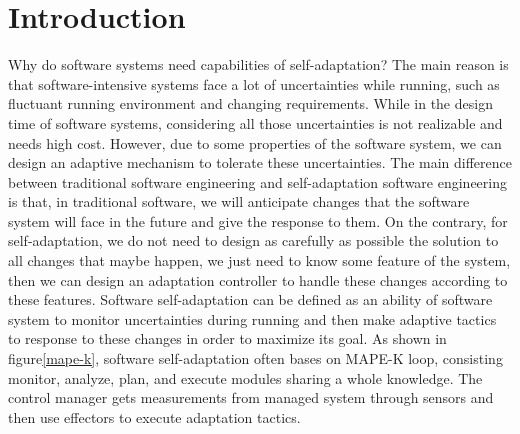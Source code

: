 \documentclass[sigconf]{acmart}
\begin{document}


\maketitle

\section{Introduction}
Why do software systems need  capabilities of self-adaptation?
The main reason is that software-intensive systems face a lot of uncertainties while running, such as fluctuant running environment and changing requirements. While in the design time of software systems, considering all those uncertainties is not realizable and needs high cost. However, due to some properties of the software system, we can design an adaptive mechanism to tolerate these uncertainties. The main difference between traditional software engineering and self-adaptation software engineering is that, in traditional software, we will anticipate changes that the software system will face in the future and give the response to them. On the contrary, for self-adaptation, we do not need to design as carefully as possible the solution to all changes that maybe happen, we just need to know some feature of the system, then we can design an adaptation controller to handle these changes according to these features.
Software self-adaptation can be defined as an ability of software system to monitor uncertainties during running and then make adaptive tactics to response to these changes in order to maximize its goal. As shown in figure\ref{mape-k}, software self-adaptation often bases on MAPE-K loop\cite{mape-k}, consisting monitor, analyze, plan, and execute modules sharing a whole knowledge. The control manager gets measurements from managed system through sensors and then use effectors to execute adaptation tactics.
\end{document}
